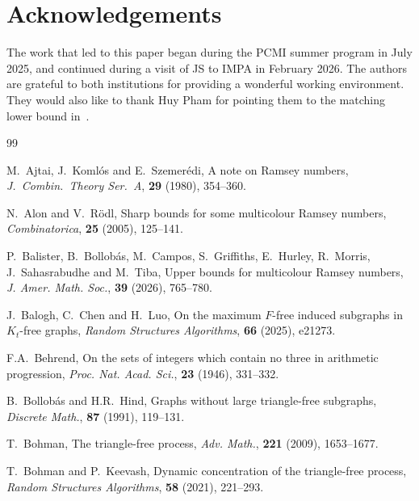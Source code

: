 \documentclass[12pt,reqno]{amsart}
\theoremstyle{remark}
\numberwithin{theorem}{section}
\renewcommand{\(}{\bigl(}
\renewcommand{\)}{\bigr)\vphantom{)}}
\begin{document}
\section*{Acknowledgements}

The work that led to this paper began during the PCMI summer program in July 2025, and continued during a visit of JS to IMPA in February 2026. The authors are grateful to both institutions for providing a wonderful working environment. They would also like to thank Huy Pham for pointing them to the matching lower bound in~\cite{JMRS21}.  

\begin{thebibliography}{99}

 M.~Ajtai, J.~Koml{\'o}s and E.~Szemer{\'e}di, A note on Ramsey numbers, \emph{J.~Combin.~Theory Ser.~A}, \textbf{29} (1980), 354--360.


 N.~Alon and V.~R\"odl, Sharp bounds for some multicolour Ramsey numbers, \emph{Combinatorica}, \textbf{25} (2005), 125--141.


 P.~Balister, B.~Bollob{\'a}s, M.~Campos, S.~Griffiths, E.~Hurley, R.~Morris, J.~Sahasrabudhe and M.~Tiba, Upper bounds for multicolour Ramsey numbers, \emph{J. Amer. Math. Soc.}, \textbf{39} (2026), 765--780.

 J.~Balogh, C.~Chen and H.~Luo, On the maximum $F$-free induced subgraphs in $K_t$-free graphs, \emph{Random Structures Algorithms}, \textbf{66} (2025), e21273.

 F.A.~Behrend, On the sets of integers which contain no three in arithmetic progression, \emph{Proc. Nat. Acad. Sci.}, \textbf{23} (1946), 331--332.

 B.~Bollob{\'a}s and H.R.~Hind, Graphs without large triangle-free subgraphs, \emph{Discrete Math.}, \textbf{87} (1991), 119--131.

 T.~Bohman, The triangle-free process, \emph{Adv. Math.}, \textbf{221} (2009), 1653--1677.

 T.~Bohman and P.~Keevash, Dynamic concentration of the triangle-free process, \emph{Random Structures Algorithms}, \textbf{58} (2021), 221--293.


\end{thebibliography}
\end{document}
